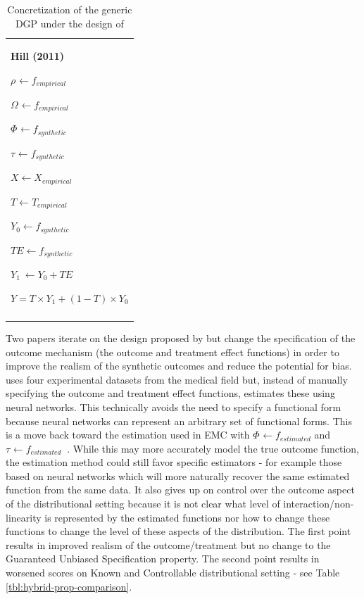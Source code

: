 \documentclass[../main.tex]{subfiles}
\begin{document}
\begin{table}[H]
 			\centering
\begin{tabular}{p{3.14in}}
\hline
\multicolumn{1}{|p{3.14in}|}{\textbf{Hill (2011)} \par  \(  \rho _{} \leftarrow f_{empirical}~ \)  \par  \(  \Omega _{} \leftarrow f_{empirical} \)  \par  \(  \Phi _{} \leftarrow f_{synthetic} \)  \par  \(  \tau_{} \leftarrow f_{synthetic}~ \)  \par  \( X \leftarrow X_{empirical} \)  \par  \( T \leftarrow T_{empirical} \)  \par  \( Y_{0} \leftarrow f_{synthetic} \)  \par  \( TE \leftarrow f_{synthetic} \)  \par  \( Y_{1}~ \leftarrow Y_{0}+ TE \)  \par  \( Y = T \times Y_{1}+  \left( 1-T \right)  \times Y_{0} \)  \par } \\
\hhline{-}

\end{tabular}
\caption{Concretization of the generic DGP under the design of \textcite{Hill2011BayesianInference}}
\label{tbl:hill-hybrid}
\end{table}



\vspace{\baselineskip}
Two papers iterate on the design proposed by \textcite{Hill2011BayesianInference} but change the specification of the outcome mechanism (the outcome and treatment effect functions) in order to improve the realism of the synthetic outcomes and reduce the potential for bias. \textcite{Wendling2018ComparingDatabases} uses four experimental datasets from the medical field but, instead of manually specifying the outcome and treatment effect functions, estimates these using neural networks. This technically avoids the need to specify a functional form because neural networks can represent an arbitrary set of functional forms. This is a move back toward the estimation used in EMC with  \(  \Phi _{} \leftarrow f_{estimated} \)  and  \(  \tau_{} \leftarrow f_{estimated}~ \) . While this may more accurately model the true outcome function, the estimation method could still favor specific estimators - for example those based on neural networks which will more naturally recover the same estimated function from the same data. It also gives up on control over the outcome aspect of the distributional setting because it is not clear what level of interaction/non-linearity is represented by the estimated functions nor how to change these functions to change the level of these aspects of the distribution. The first point results in improved realism of the outcome/treatment but no change to the Guaranteed Unbiased Specification property. The second point results in worsened scores on Known and Controllable distributional setting - see Table \ref{tbl:hybrid-prop-comparison}.\par
\end{document}
